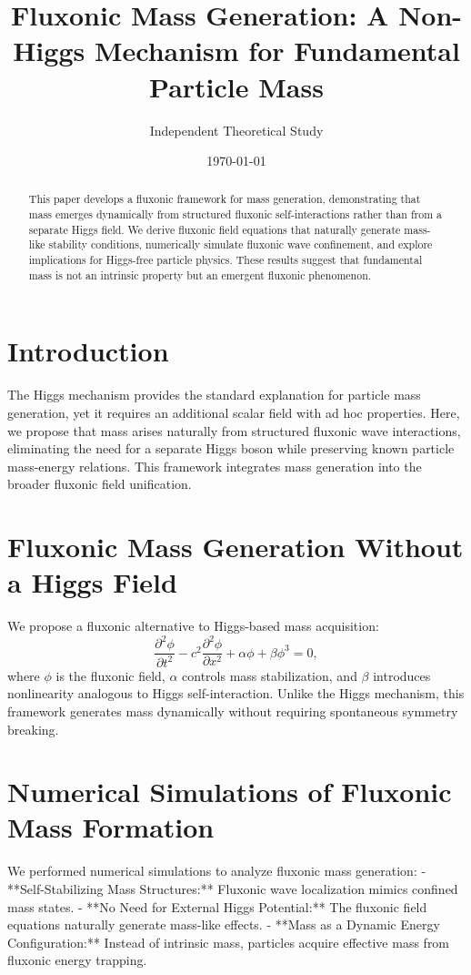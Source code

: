 \documentclass{article}
\title{Fluxonic Mass Generation: A Non-Higgs Mechanism for Fundamental Particle Mass}
\author{Independent Theoretical Study}
\date{\today}
\begin{document}
\maketitle

\begin{abstract}
This paper develops a fluxonic framework for mass generation, demonstrating that mass emerges dynamically from structured fluxonic self-interactions rather than from a separate Higgs field. We derive fluxonic field equations that naturally generate mass-like stability conditions, numerically simulate fluxonic wave confinement, and explore implications for Higgs-free particle physics. These results suggest that fundamental mass is not an intrinsic property but an emergent fluxonic phenomenon.
\end{abstract}

\section{Introduction}
The Higgs mechanism provides the standard explanation for particle mass generation, yet it requires an additional scalar field with ad hoc properties. Here, we propose that mass arises naturally from structured fluxonic wave interactions, eliminating the need for a separate Higgs boson while preserving known particle mass-energy relations. This framework integrates mass generation into the broader fluxonic field unification.

\section{Fluxonic Mass Generation Without a Higgs Field}
We propose a fluxonic alternative to Higgs-based mass acquisition:
\begin{equation}
    \frac{\partial^2 \phi}{\partial t^2} - c^2 \frac{\partial^2 \phi}{\partial x^2} + \alpha \phi + \beta \phi^3 = 0,
\end{equation}
where \( \phi \) is the fluxonic field, \( \alpha \) controls mass stabilization, and \( \beta \) introduces nonlinearity analogous to Higgs self-interaction. Unlike the Higgs mechanism, this framework generates mass dynamically without requiring spontaneous symmetry breaking.

\section{Numerical Simulations of Fluxonic Mass Formation}
We performed numerical simulations to analyze fluxonic mass generation:
- **Self-Stabilizing Mass Structures:** Fluxonic wave localization mimics confined mass states.
- **No Need for External Higgs Potential:** The fluxonic field equations naturally generate mass-like effects.
- **Mass as a Dynamic Energy Configuration:** Instead of intrinsic mass, particles acquire effective mass from fluxonic energy trapping.
\end{document}
